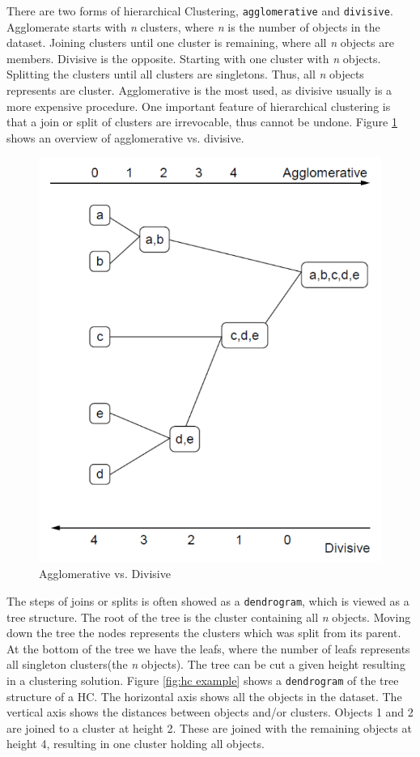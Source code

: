 \documentclass[a4paper,10pt]{article}
\theoremstyle{plain}
\theoremstyle{definition}
\begin{document}
There are two forms of hierarchical Clustering, \texttt{agglomerative} and \texttt{divisive}. Agglomerate starts with \textit{n} clusters, where \textit{n} is the number of objects in the dataset. Joining clusters until one cluster is remaining, where all \textit{n} objects are members. Divisive is the opposite. Starting with one cluster with \textit{n} objects. Splitting the clusters until all clusters are singletons. Thus, all \textit{n} objects represents are cluster. Agglomerative is the most used, as divisive usually is a more expensive procedure. One important feature of hierarchical clustering is that a join or split of clusters are irrevocable, thus cannot be undone. Figure \ref{fig:agglo_vs_div} shows an overview of agglomerative vs. divisive.
\begin{figure}[H]
	\centering
	\includegraphics*[scale=0.4]{./pictures/hc/agglo_vs_div.png}
	\caption{Agglomerative vs. Divisive}
	\label{fig:agglo_vs_div}
\end{figure} 
The steps of joins or splits is often showed as a \texttt{dendrogram}, which is viewed as a tree structure. The root of the tree is the cluster containing all \textit{n} objects. Moving down the tree the nodes represents the clusters which was split from its parent. At the bottom of the tree we have the leafs, where the number of leafs represents all singleton clusters(the \textit{n} objects). The tree can be cut a given height resulting in a clustering solution. Figure \ref{fig:hc example} shows a \texttt{dendrogram} of the tree structure of a HC. The horizontal axis shows all the objects in the dataset. The vertical axis shows the distances between objects and/or clusters. Objects 1 and 2 are joined to a cluster at height 2. These are joined with the remaining objects at height 4, resulting in one cluster holding all objects.
\end{document}
